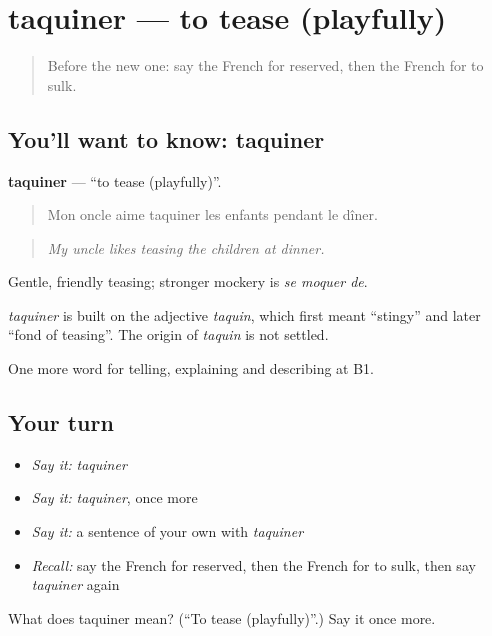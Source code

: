 \section[taquiner]{taquiner — to tease (playfully)}

\label{lesson:FR-C466-taquiner}



\begin{quote}
Before the new one: say the French for reserved, then the French for to sulk.
\end{quote}

\subsection*{You'll want to know: taquiner}
\textbf{taquiner} — \textquotedblleft{}to tease (playfully)\textquotedblright{}.

\begin{quote}
Mon oncle aime taquiner les enfants pendant le dîner.
\end{quote}

\begin{quote}
\emph{My uncle likes teasing the children at dinner.}
\end{quote}

Gentle, friendly teasing; stronger mockery is \emph{se moquer de}.

\begin{cousinweb}
\emph{taquiner} is built on the adjective \emph{taquin}, which first meant \textquotedblleft{}stingy\textquotedblright{} and later \textquotedblleft{}fond of teasing\textquotedblright{}. The origin of \emph{taquin} is not settled.
\end{cousinweb}

\begin{grammarlens}[title={What you've built}]
One more word for telling, explaining and describing at B1.
\end{grammarlens}

\subsection*{Your turn}
\begin{itemize}
\raggedright
  \item \emph{Say it:} \emph{taquiner}
  \item \emph{Say it:} \emph{taquiner}, once more
  \item \emph{Say it:} a sentence of your own with \emph{taquiner}
  \item \emph{Recall:} say the French for reserved, then the French for to sulk, then say \emph{taquiner} again
\end{itemize}

\begin{tcolorbox}[breakable,colback=teal!4,colframe=teal!35!black,title={Before you move on}]
What does taquiner mean? (\textquotedblleft{}To tease (playfully)\textquotedblright{}.) Say it once more.
\end{tcolorbox}
